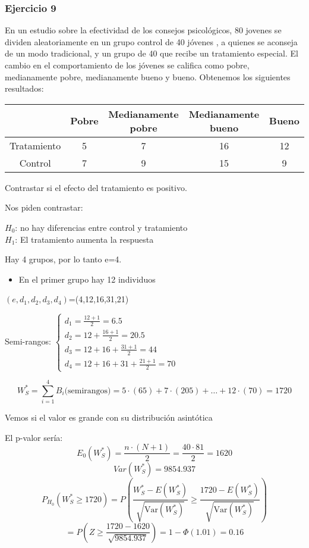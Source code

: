 \subsubsection*{Ejercicio 9}
En un  estudio sobre la efectividad de los consejos psicológicos, 80 jovenes se dividen aleatoriamente en un grupo control de 40 jóvenes
, a quienes se aconseja de un modo tradicional, y un grupo de 40 que recibe un tratamiento especial. El cambio en el comportamiento de los jóvenes se califica como
pobre, medianamente pobre, medianamente bueno y bueno. Obtenemos los siguientes resultados:
\begin{table}[h!]
    \centering
    \begin{tabular}{|c|c|c|c|c|}
    \hline
    & Pobre & Medianamente pobre & Medianamente bueno & Bueno \\ \hline
    Tratamiento & 5 & 7 & 16 & 12 \\ \hline
    Control     & 7 & 9 & 15 & 9  \\ \hline
    \end{tabular}
\end{table}

Contrastar si el efecto del tratamiento es positivo.

Nos piden contrastar:

\begin{center}
    $H_0$: no hay diferencias entre control y tratamiento \\
    $H_1$: El tratamiento aumenta la respuesta
\end{center}

Hay 4 grupos, por lo tanto e=4.

\begin{itemize}
    \item En el primer grupo hay 12 individuos
\end{itemize}

$(e,d_1,d_2,d_3,d_4)$=(4,12,16,31,21)

Semi-rangos:
\(
\left\{
\begin{matrix}
    d_1=\frac{12+1}{2}=6.5 \\
    d_2=12+\frac{16+1}{2}=20.5 \\
    d_3=12+16+\frac{31+1}{2}=44 \\
    d_4=12+16+31+\frac{21+1}{2}=70
\end{matrix}
\right.
\)

\[
    W_S^*=\sum_{i=1}^{4} B_i \text{(semirangos)}=5\cdot (65)+ 7\cdot (205)+ \dots+12 \cdot (70)=1720
\]

Vemos si el valor es grande con su distribución asintótica

El p-valor sería:
\[
    E_0(W_S^*) = \frac{n \cdot (N+1)}{2} = \frac{40 \cdot 81}{2} = 1620
\]
\[
    Var(W_S^*) = 9854.937
\]
\[
    P_{H_0}(W_S^* \geq 1720) = P \left( \frac{W_S^* - E(W_S^*)}{\sqrt{\text{Var}(W_S^*)}} \geq \frac{1720 - E(W_S^*)}{\sqrt{\text{Var}(W_S^*)}} \right)
\]
\[
    = P \left(Z \geq \frac{1720 - 1620}{\sqrt{9854.937}} \right) = 1 - \Phi(1.01) = 0.16
\]
